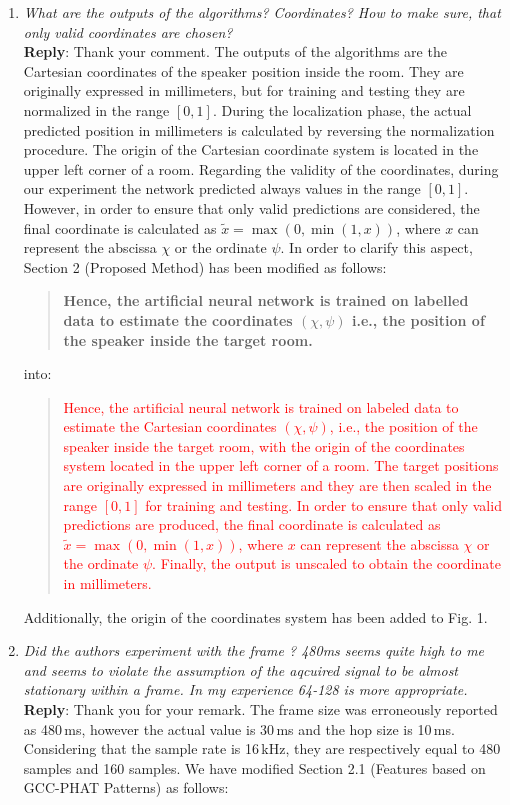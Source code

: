\documentclass[11pt, technote, letterpaper, oneside, onecolumn]{IEEEtran}
\begin{document}
\begin{enumerate}
\item \textit{What are the outputs of the algorithms? Coordinates? How to make sure, that only valid coordinates are chosen?\\}
\textbf{Reply}: Thank your comment. The outputs of the algorithms are the Cartesian coordinates of the speaker position inside the room. They are originally expressed in millimeters, but for training and testing they are normalized in the range $[0,1]$. During the localization phase, the actual predicted position in millimeters is calculated by reversing the normalization procedure. The origin of the Cartesian coordinate system is located in the upper left corner of a room. Regarding the validity of the coordinates, during our experiment the network predicted always values in the range $[0,1]$. However, in order to ensure that only valid predictions are considered, the final coordinate is calculated as $\tilde{x} =\max(0, \min(1, x))$, where $x$ can represent the abscissa $\chi$ or the ordinate $\psi$.  In order to clarify this aspect, Section 2 (Proposed Method) has been modified as follows:
\begin{quote}
	\textbf{Hence, the artificial neural network is trained on labelled data to estimate the coordinates $(\chi,\psi)$ i.e., the position of the speaker inside the target room.}
\end{quote}
into:
\begin{quote}
	\textcolor{red}{Hence, the artificial neural network is trained on labeled data to estimate the Cartesian coordinates $\left ( \chi,\psi \right )$, i.e., the position of the speaker inside the target room, with the origin of the coordinates system located in the upper left corner of a room. The target positions are originally expressed in millimeters and they are then scaled in the range $[0,1]$ for training and testing. In order to ensure that only valid predictions are produced, the final coordinate is calculated as $\tilde{x} =\max(0, \min(1, x))$, where $x$ can represent the abscissa $\chi$ or the ordinate $\psi$. Finally, the output is unscaled to obtain the coordinate in millimeters.}
\end{quote}
Additionally, the origin of the coordinates system has been added to Fig. 1.


\item \textit{Did the authors experiment with the frame ? 480ms seems quite high to me and seems to violate the assumption of the aqcuired signal to be almost stationary within a frame. In my experience 64-128 is more appropriate.\\}
\textbf{Reply}: Thank you for your remark. The frame size was erroneously reported as 480\,ms, however the actual value is 30\,ms and the hop size is 10\,ms. Considering that the sample rate is 16\,kHz, they are respectively equal to 480 samples and 160 samples. We have modified Section 2.1 (Features based on GCC-PHAT Patterns) as follows:


\end{enumerate}
\end{document}
